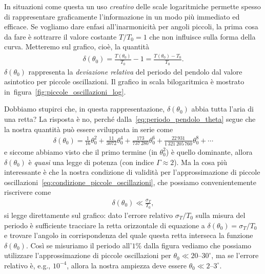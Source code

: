 In situazioni come questa un uso \emph{creativo} delle scale logaritmiche
permette spesso di rappresentare graficamente l'informazione in un modo
più immediato ed efficace. Se vogliamo dare enfasi all'inarmonicità per
angoli piccoli, la prima cosa da fare è sottrarre il valore costante
$T/T_0 = 1$ che non influisce sulla forma della curva. Metteremo sul grafico,
cioè, la quantità
\begin{align}
  \delta(\theta_0) = \frac{T(\theta_0)}{T_0} - 1 = \frac{T(\theta_0) - T_0}{T_0}.
\end{align}
$\delta(\theta_0)$ rappresenta la \emph{deviazione relativa} del periodo del
pendolo dal valore asintotico per piccole oscillazioni. Il grafico in scala
bilogaritmica è mostrato in~figura~\ref{fig:piccole_oscillazioni_log}.


Dobbiamo stupirci che, in questa rappresentazione, $\delta(\theta_0)$ abbia tutta
l'aria di una retta? La risposta è no, perché dalla~\eqref{eq:periodo_pendolo_theta}
segue che la nostra quantità può essere sviluppata in serie come
\begin{align*}
  \delta(\theta_0) = \frac{1}{16}\theta_0^2 +
  \frac{11}{3072}\theta_0^4 + \frac{173}{737\,280}\theta_0^6 +
  \frac{22\,931}{1\,321\,205\,760}\theta_0^8 +
  \cdots
\end{align*}
e siccome abbiamo visto che il primo termine (in $\theta_0^2$) è quello
dominante, allora $\delta(\theta_0)$ è \emph{quasi} una legge di potenza
(con indice $\Gamma \approx 2$). Ma la cosa più interessante è che la nostra
condizione di validità per l'approssimazione di piccole
oscillazioni~\eqref{eq:condizione_piccole_oscillazioni}, che possiamo
convenientemente riscrivere come
\begin{align*}
  \delta(\theta_0) \ll \frac{\sigma_T}{T_0},
\end{align*}
si legge direttamente sul grafico: dato l'errore relativo $\sigma_T/T_0$ sulla
misura del periodo è sufficiente tracciare la retta orizzontale di
equazione a $\delta(\theta_0) = \sigma_T/T_0$ e trovare l'angolo in
corrispondenza del quale questa retta interseca la funzione $\delta(\theta_0)$.
Così se misuriamo il periodo all'$1\%$ dalla figura vediamo che possiamo
utilizzare l'approssimazione di piccole oscillazioni per
$\theta_0 \ll 20$--$30^\circ$, ma se l'errore relativo è, e.g., $10^{-4}$,
allora la nostra ampiezza deve essere $\theta_0 \ll 2$--$3^\circ$.


